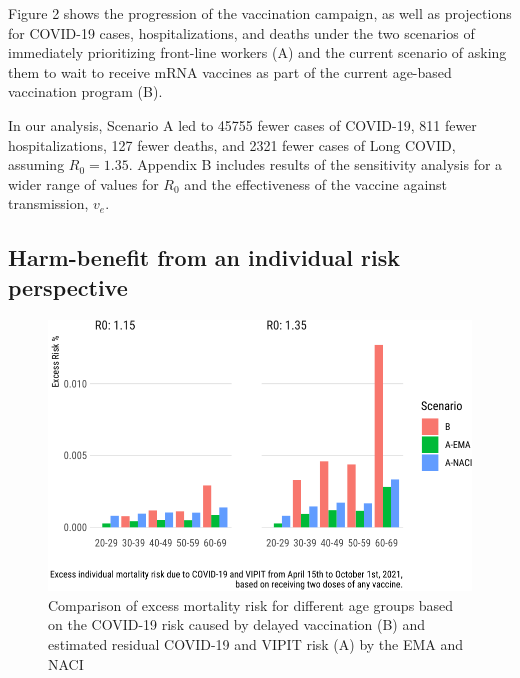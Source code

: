 \documentclass[]{interact}
\theoremstyle{plain}%
\theoremstyle{definition}
\theoremstyle{remark}
\begin{document}
Figure 2 shows the progression of the vaccination campaign, as well as
projections for COVID-19 cases, hospitalizations, and deaths under the
two scenarios of immediately prioritizing front-line workers (A) and the
current scenario of asking them to wait to receive mRNA vaccines as part
of the current age-based vaccination program (B).

In our analysis, Scenario A led to 45755 fewer cases of COVID-19, 811
fewer hospitalizations, 127 fewer deaths, and 2321 fewer cases of Long
COVID, assuming \(R_0=1.35\). Appendix B includes results of the
sensitivity analysis for a wider range of values for \(R_0\) and the
effectiveness of the vaccine against transmission, \(v_e\).

\hypertarget{harm-benefit-from-an-individual-risk-perspective}{%
\subsection{Harm-benefit from an individual risk
perspective}\label{harm-benefit-from-an-individual-risk-perspective}}

\begin{figure}

{\centering \includegraphics[width=0.9\linewidth]{theCaseforAZ_files/figure-latex/covidvsvipit-1} 

}

\caption{ Comparison of excess mortality risk for different age groups based on the COVID-19 risk caused by delayed vaccination (B) and estimated residual COVID-19 and VIPIT risk (A) by the EMA and NACI}\label{fig:covidvsvipit}
\end{figure}
\end{document}
